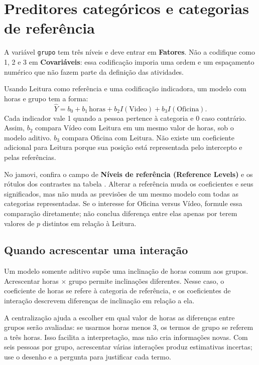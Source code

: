 \section{Preditores categóricos e categorias de referência}

A variável \texttt{grupo} tem três níveis e deve entrar em \textbf{Fatores}. Não a codifique como 1, 2 e 3 em \textbf{Covariáveis}: essa codificação imporia uma ordem e um espaçamento numérico que não fazem parte da definição das atividades.

Usando Leitura como referência e uma codificação indicadora, um modelo com horas e grupo tem a forma:
\[
\widehat{Y}=b_0+b_1\,\text{horas}
+b_2I(\text{Video})+b_3I(\text{Oficina}).
\]
Cada indicador vale 1 quando a pessoa pertence à categoria e 0 caso contrário. Assim, $b_2$ compara Vídeo com Leitura em um mesmo valor de horas, sob o modelo aditivo. $b_3$ compara Oficina com Leitura. Não existe um coeficiente adicional para Leitura porque sua posição está representada pelo intercepto e pelas referências.

No jamovi, confira o campo de \textbf{Níveis de referência (Reference Levels)} e os rótulos dos contrastes na tabela \parencite{JamoviRegressao}. Alterar a referência muda os coeficientes e seus significados, mas não muda as previsões de um mesmo modelo com todas as categorias representadas. Se o interesse for Oficina versus Vídeo, formule essa comparação diretamente; não conclua diferença entre elas apenas por terem valores de $p$ distintos em relação à Leitura.

\subsection{Quando acrescentar uma interação}

Um modelo somente aditivo supõe uma inclinação de horas comum aos grupos. Acrescentar horas $\times$ grupo permite inclinações diferentes. Nesse caso, o coeficiente de horas se refere à categoria de referência, e os coeficientes de interação descrevem diferenças de inclinação em relação a ela.

A centralização ajuda a escolher em qual valor de horas as diferenças entre grupos serão avaliadas: se usarmos horas menos 3, os termos de grupo se referem a três horas. Isso facilita a interpretação, mas não cria informações novas. Com seis pessoas por grupo, acrescentar várias interações produz estimativas incertas; use o desenho e a pergunta para justificar cada termo.

